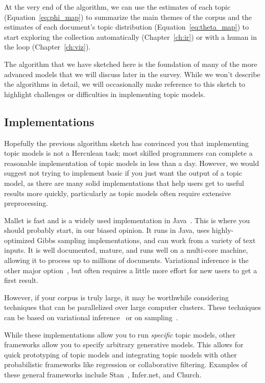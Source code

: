 At the very end of the algorithm, we can use the estimates of each topic
(Equation~\ref{eq:phi_map}) to summarize the main themes of the corpus and the
estimates of each document's topic distribution (Equation~\ref{eq:theta_map}) to
start exploring the collection automatically (Chapter~\ref{ch:ir}) or with a
human in the loop (Chapter~\ref{ch:viz}).

The algorithm that we have sketched here is the foundation of many of the more
advanced models that we will discuss later in the survey.  While we won't describe
the algorithms in detail, we will occasionally make reference to this sketch to
highlight challenges or difficulties in implementing topic models.

\subsection{Implementations}

Hopefully the previous algorithm sketch has convinced you that implementing
topic models is not a Herculean task; most skilled programmers can complete a
reasonable implementation of topic models in less than a day.  However, we would
suggest not trying to implement basic  if you just want the
output of a topic model, as there are many solid
implementations that help users get to useful results more quickly, particularly
as topic models often require extensive preprocessing.

Mallet is fast and is a widely used implementation in Java~\citep{mallet}.  This
is where you should probably start, in our biased opinion.  It runs in Java, uses
highly-optimized Gibbs sampling implementations, and can work from a variety of
text inputs.  It is well documented, mature, and runs well on a multi-core
machine, allowing it to process up to millions of documents.  Variational
inference is the other major option~\citep{blei-03,vw}, but often requires a
little more effort for new users to get a first result.

However, if your corpus is truly large, it may be worthwhile
considering techniques that can be parallelized over large computer
clusters.  These techniques can be based on variational
inference~\citep{Narayanamurthy-11,zhai-12} or on
sampling~\citep{newman-08}.

While these implementations allow you to run \emph{specific} topic models, other
frameworks allow you to specify arbitrary generative
models.  This allows for quick prototyping of topic models and integrating topic
models with other probabilistic frameworks like regression or collaborative
filtering.  Examples of these general frameworks include
Stan~\citep{stan-software:2014}, Infer.net, and Church.

